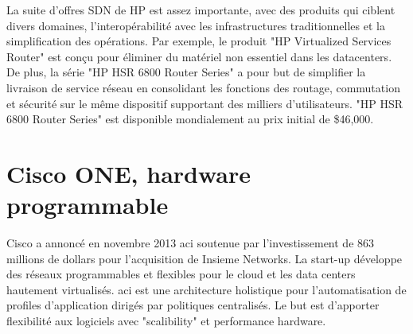 
La suite d'offres SDN de HP est assez importante, avec des produits qui ciblent divers domaines, l'interopérabilité avec les infrastructures traditionnelles et la simplification des opérations. Par exemple, le produit "HP Virtualized Services Router" est conçu pour éliminer du matériel non essentiel dans les \glspl{datacenter}. De plus, la série "HP HSR 6800 Router Series" a pour but de simplifier la livraison de service réseau en consolidant les fonctions des routage, commutation et sécurité sur le même dispositif supportant des milliers d'utilisateurs. "HP HSR 6800 Router Series" est disponible mondialement au prix initial de \$46,000. \cite{ExecutiveGuideToSDNHPFabric}



\section{Cisco ONE, hardware programmable}





Cisco a annoncé en novembre 2013 \gls{aci} soutenue par l'investissement de 863 millions de dollars pour l'acquisition de Insieme Networks. La start-up développe des réseaux programmables et flexibles pour le cloud et les data centers hautement virtualisés. \gls{aci} est une architecture holistique pour l'automatisation de profiles d'application dirigés par politiques centralisés. Le but est d'apporter flexibilité aux logiciels avec "scalibility" et performance hardware. 


